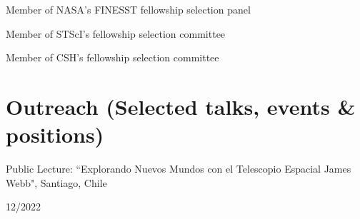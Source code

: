 \documentclass[12pt, a4paper]{article} %
\begin{document}
\vspace{0.2cm}

\begin{minipage}[t]{0.7\textwidth}
\begin{flushleft}%
  \setlength{\leftskip}{0.2cm}%
Member of NASA's FINESST fellowship selection panel
\end{flushleft}
\end{minipage}
\begin{minipage}[t]{0.3\textwidth}
\hfill 
\end{minipage}

\vspace{0.2cm}

\begin{minipage}[t]{0.7\textwidth}
\begin{flushleft}%
  \setlength{\leftskip}{0.2cm}%
Member of STScI's fellowship selection committee
\end{flushleft}
\end{minipage}
\begin{minipage}[t]{0.3\textwidth}
\hfill 
\end{minipage}

\vspace{0.2cm}

\begin{minipage}[t]{0.7\textwidth}
\begin{flushleft}%
  \setlength{\leftskip}{0.2cm}%
Member of CSH's fellowship selection committee
\end{flushleft}
\end{minipage}
\begin{minipage}[t]{0.3\textwidth}
\hfill 
\end{minipage}

\section*{Outreach (Selected talks, events \& positions)}

\begin{minipage}[t]{0.7\textwidth}
\begin{flushleft}%
  \setlength{\leftskip}{0.2cm}%
Public Lecture: ``Explorando Nuevos Mundos con el Telescopio Espacial James Webb", Santiago, Chile
\end{flushleft}
\end{minipage}
\begin{minipage}[t]{0.3\textwidth}
\hfill 12/2022
\end{minipage}
\end{document}
